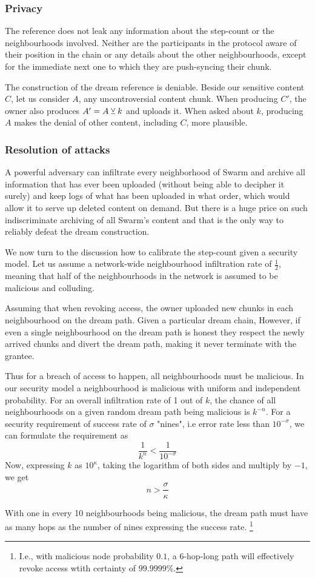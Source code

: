 \subsubsection{Privacy}


The reference does not leak any information about the step-count or the neighbourhoods involved. Neither are the participants in the protocol aware of their position in the chain or any details about the other neighbourhoods, except for the immediate next one to which they are push-syncing their chunk.

The construction of the dream reference is deniable.
Beside our sensitive content $C$, let us consider $A$, any uncontroversial content chunk. When producing $C'$, the owner also produces  $A'=A\veebar k$ and uploads it. When asked about $k$, producing $A$ makes the denial of other content, including $C$, more plausible. 

\subsubsection{Resolution of attacks}


A powerful adversary can infiltrate every neighborhood of Swarm and archive all information that has ever been uploaded (without being able to decipher it surely) and keep logs of what has been uploaded in what order, which would allow it to serve up deleted content on demand. But there is a huge price on such indiscriminate archiving of all Swarm's content and that is the only way to reliably defeat the dream construction.

We now turn to the discussion how to calibrate the step-count given a security model. Let us assume a network-wide neighbourhood infiltration rate of $\frac{1}{2}$, meaning that  half of the neighbourhoods in the network is assumed  to be  malicious and colluding. 

Assuming that when  revoking access, the owner uploaded new chunks in each neighbourhood on the dream path. 
Given a particular dream chain, 
However, if even  a single neighbourhood on the dream path is honest they respect the newly arrived chunks and divert the dream path, making it never terminate with the grantee. 


Thus for  a breach of access to happen, all neighbourhoods must be malicious.
In our security model a neighbourhood is malicious with  uniform and independent probability.  For an overall infiltration rate of 1 out of $k$, the chance of all neighbourhoods on a given random dream path being malicious is $k^{-n}$. For a security requirement of success rate of $\sigma$ "nines", i.e error rate less than $10^{-\sigma}$,  we can formulate the requirement as
%
\begin{equation}
    \frac{1}{k^n}< \frac{1}{10^{-\sigma}}
\end{equation}
Now, expressing $k$ as $10^\kappa$, taking the logarithm of both sides and multiply by $-1$, we get
%
\begin{equation}
    n > \frac{\sigma}{\kappa}
\end{equation}

With one in every 10 neighbourhoods being malicious, the dream path must have as many hops as the number of nines expressing the success rate.%
%
\footnote{I.e., with malicious node probability $0.1$, a 6-hop-long path will effectively revoke access wtith certainty of $99.9999\%$.}
